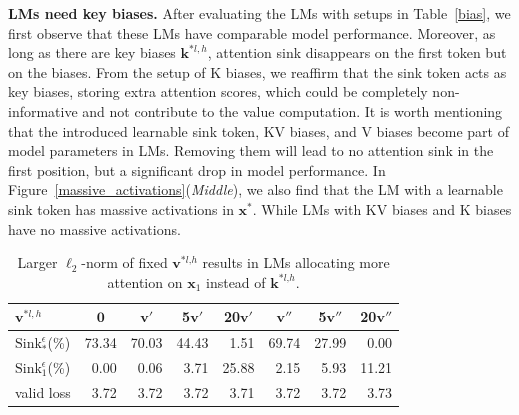 \textbf{LMs need key biases.} After evaluating the LMs with setups in Table~\ref{bias}, we first observe that these LMs have comparable model performance. Moreover, as long as there are key biases $\boldsymbol{k}^{*l\textrm{,}\,h}$, attention sink disappears on the first token but on the biases. From the setup of K biases, we reaffirm that the sink token acts as key biases, storing extra attention scores, which could be completely non-informative and not contribute to the value computation. It is worth mentioning that the introduced learnable sink token, KV biases, and V biases become part of model parameters in LMs. Removing them will lead to no attention sink in the first position, but a significant drop in model performance. In Figure~\ref{massive_activations}(\emph{Middle}),  we also find that the LM with a learnable sink token has massive activations in $\boldsymbol{x}^*$. While LMs with KV biases and K biases have no massive activations.



\begin{table}[t]
\vspace{-0.2cm}
\caption{Larger $\ell_2$-norm of fixed $\boldsymbol{v}^{*l\textrm{,}h}$ results in LMs allocating more attention on $\boldsymbol{x}_1$ instead of $\boldsymbol{k}^{*l\textrm{,}h}$.}
\vspace{-.4cm}
\begin{center}
\begin{tabular}{l|ccccccc}
\toprule
$\boldsymbol{v}^{*l,h}$ & $\boldsymbol{0}$ & $\boldsymbol{v}'$ & 5$\boldsymbol{v}'$ & 20$\boldsymbol{v}'$ & $\boldsymbol{v}''$ & 5$\boldsymbol{v}''$  & 20$\boldsymbol{v}''$  \\
\midrule
$\textrm{Sink}_{*}^{\epsilon}$(\%) & 73.34 & 70.03 & 44.43 & \,\,\,1.51 & 69.74 & 27.99 &  \,\,\,0.00 \\
$\textrm{Sink}_{1}^{\epsilon}$(\%) & \,\,\,0.00 &  \,\,\,0.06 & \,\,\,3.71 & 25.88 & \,\,\,2.15 & \,\,\,5.93 & 11.21 \\
valid loss & \,\,\,3.72 & \,\,\,3.72 & \,\,\,3.72 & \,\,\,3.71 & \,\,\,3.72 & \,\,\,3.72 & \,\,\,3.73 \\
\bottomrule
\end{tabular}
\end{center}
\vspace{-.4cm}
\label{v_norm}
\end{table}

